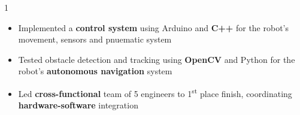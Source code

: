 \documentclass[11pt,a4paper,ragged2e]{altacv}
\begin{document}
\begin{paracol}{1}

\begin{itemize}
\item Implemented a  \textbf{control system} using Arduino and \textbf{C++} for the robot's movement, sensors and pnuematic system
\item Tested obstacle detection and tracking using \textbf{OpenCV} and Python for the robot's \textbf{autonomous navigation} system
\item Led \textbf{cross-functional} team of 5 engineers to 1\textsuperscript{st} place finish, coordinating \textbf{hardware-software} integration
\end{itemize}
\tightdivider



\end{paracol}
\end{document}
